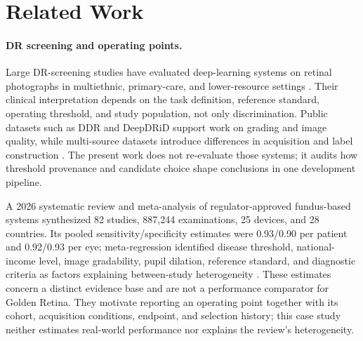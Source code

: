 \documentclass[11pt]{article}
\begin{document}
\section{Related Work}
\paragraph{DR screening and operating points.} Large DR-screening studies have evaluated deep-learning systems on retinal photographs in multiethnic, primary-care, and lower-resource settings \cite{gulshan2016,ting2017,abramoff2018,bellemo2019}. Their clinical interpretation depends on the task definition, reference standard, operating threshold, and study population, not only discrimination. Public datasets such as DDR and DeepDRiD support work on grading and image quality, while multi-source datasets introduce differences in acquisition and label construction \cite{ddr,deepdrid,drtidpaper}. The present work does not re-evaluate those systems; it audits how threshold provenance and candidate choice shape conclusions in one development pipeline.

A 2026 systematic review and meta-analysis of regulator-approved fundus-based systems synthesized 82 studies, 887,244 examinations, 25 devices, and 28 countries. Its pooled sensitivity/specificity estimates were 0.93/0.90 per patient and 0.92/0.93 per eye; meta-regression identified disease threshold, national-income level, image gradability, pupil dilation, reference standard, and diagnostic criteria as factors explaining between-study heterogeneity \cite{wang2026approveddr}. These estimates concern a distinct evidence base and are not a performance comparator for Golden Retina. They motivate reporting an operating point together with its cohort, acquisition conditions, endpoint, and selection history; this case study neither estimates real-world performance nor explains the review's heterogeneity.
\end{document}
